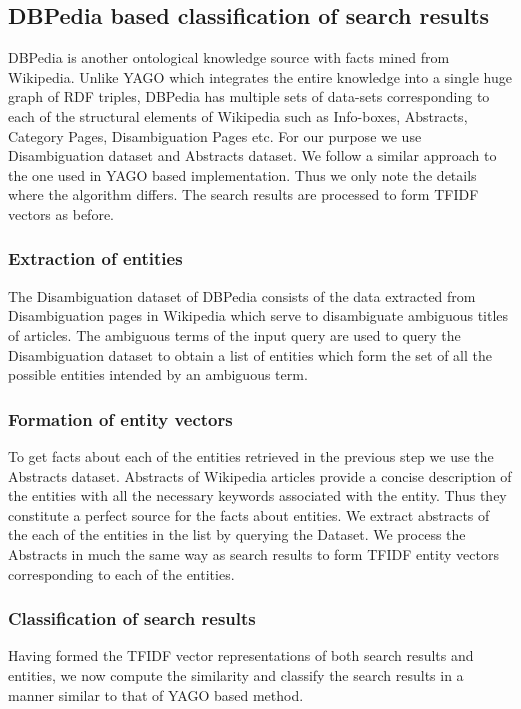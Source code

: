 \documentclass[a4paper,12pt]{report}
\begin{document}
\subsection{DBPedia based classification of search results}
DBPedia is another ontological knowledge source with facts mined from
Wikipedia. Unlike YAGO which integrates the entire knowledge into a
single huge graph of RDF triples, DBPedia has multiple sets of
data-sets corresponding to each of the structural elements of Wikipedia
such as Info-boxes, Abstracts, Category Pages, Disambiguation Pages
etc. For our purpose we use Disambiguation dataset and Abstracts
dataset. We follow a similar approach to the one used in YAGO based
implementation. Thus we only note the details where the algorithm
differs. The search results are processed to form TFIDF vectors as
before.

\subsubsection{Extraction of entities}
The Disambiguation dataset of DBPedia consists of the data extracted
from Disambiguation pages in Wikipedia which serve to disambiguate
ambiguous titles of articles. The ambiguous terms of the input query
are used to query the Disambiguation dataset to obtain a list of
entities which form the set of all the possible entities intended by
an ambiguous term.

\subsubsection{Formation of entity vectors}
To get facts about each of the entities retrieved in the previous step
we use the Abstracts dataset. Abstracts of Wikipedia articles provide
a concise description of the entities with all the necessary keywords
associated with the entity. Thus they constitute a perfect source for
the facts about entities. We extract abstracts of the each of the
entities in the list by querying the Dataset. We process the Abstracts
in much the same way as search results to form TFIDF entity vectors
corresponding to each of the entities.

\subsubsection{Classification of search results}
Having formed the TFIDF vector representations of both search results
and entities, we now compute the similarity and classify the search
results in a manner similar to that of YAGO based method.
\end{document}
